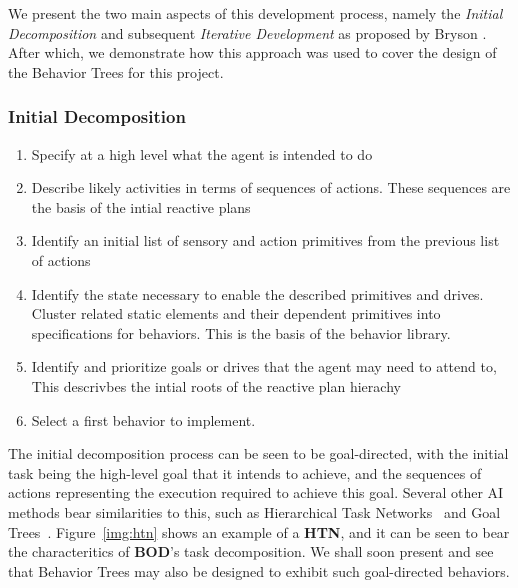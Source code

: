         We present the two main aspects of this development process, namely the \emph{Initial Decomposition} and subsequent \emph{Iterative Development} as proposed by Bryson \cite{bod}. After which, we demonstrate how this approach was used to cover the design of the Behavior Trees for this project.
        
        \pagebreak
        
        \subsubsection{Initial Decomposition}
        \label{sec:init-decompose}
        
        \begin{enumerate}
            \item Specify at a high level what the agent is intended to do
            \item Describe likely activities in terms of sequences of actions. These sequences are the basis of the intial reactive plans
            \item Identify an initial list of sensory and action primitives from the previous list of actions
            \item Identify the state necessary to enable the described primitives and drives. Cluster related static elements and their dependent primitives into specifications for behaviors. This is the basis of the behavior library.
            \item Identify and prioritize goals or drives that the agent may need to attend to, This descrivbes the intial roots of the reactive plan hierachy
            \item Select a first behavior to implement.       
        \end{enumerate}
        
        The initial decomposition process can be seen to be goal-directed, with the initial task being the high-level goal that it intends to achieve, and the sequences of actions representing the execution required to achieve this goal. Several other AI methods bear similarities to this, such as Hierarchical Task Networks~\cite{htn} and Goal Trees~\cite{goaltrees}. Figure~\ref{img:htn} shows an example of a \textbf{HTN}, and it can be seen to bear the characteritics of \textbf{BOD}'s task decomposition. We shall soon present and see that Behavior Trees may also be designed to exhibit such goal-directed behaviors.
        
